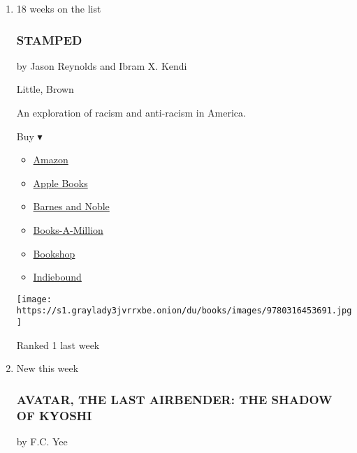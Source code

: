 \begin{enumerate}
\def\labelenumi{\arabic{enumi}.}
\item
  18 weeks on the list

  \hypertarget{stamped}{%
  \subsubsection{STAMPED}\label{stamped}}

  by Jason Reynolds and Ibram X. Kendi

  Little, Brown

  An exploration of racism and anti-racism in America.

  Buy ▾

  \begin{itemize}
  \tightlist
  \item
    \href{https://www.amazon.com/dp/0316453692?tag=NYTBSREV-20\&tag=NYTBS-20}{Amazon}
  \item
    \href{https://du-gae-books-dot-nyt-du-prd.appspot.com/buy?title=STAMPED\&author=Jason+Reynolds+and+Ibram+X+Kendi}{Apple
    Books}
  \item
    \href{https://www.anrdoezrs.net/click-7990613-11819508?url=https\%3A\%2F\%2Fwww.barnesandnoble.com\%2Fw\%2F\%3Fean\%3D9780316453691}{Barnes
    and Noble}
  \item
    \href{https://www.anrdoezrs.net/click-7990613-35140?url=https\%3A\%2F\%2Fwww.booksamillion.com\%2Fp\%2FSTAMPED\%2FJason\%2BReynolds\%2Band\%2BIbram\%2BX\%2BKendi\%2F9780316453691}{Books-A-Million}
  \item
    \href{https://bookshop.org/a/3546/9780316453691}{Bookshop}
  \item
    \href{https://www.indiebound.org/book/9780316453691?aff=NYT}{Indiebound}
  \end{itemize}

  \texttt{[image: https://s1.graylady3jvrrxbe.onion/du/books/images/9780316453691.jpg]}

  Ranked 1 last week
\item
  New this week

  \hypertarget{avatar-the-last-airbender-the-shadow-of-kyoshi}{%
  \subsubsection{AVATAR, THE LAST AIRBENDER: THE SHADOW OF
  KYOSHI}\label{avatar-the-last-airbender-the-shadow-of-kyoshi}}

  by F.C. Yee


\end{enumerate}
